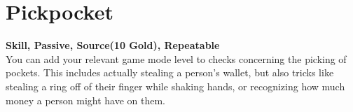 \section{Pickpocket}\label{sec:pickpocket}
\textbf{Skill, Passive, Source(10 Gold), Repeatable}\\
You can add your relevant game mode level to checks concerning the picking of pockets.
This includes actually stealing a person's wallet, but also tricks like stealing a ring off of their finger while shaking hands, or recognizing  how much money a person might have on them.